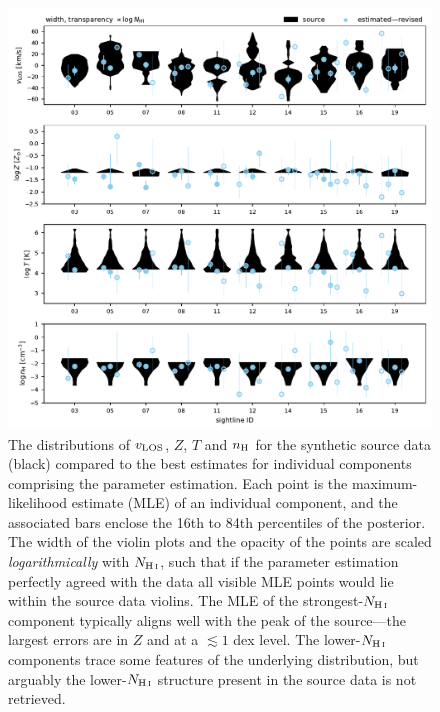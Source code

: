 \documentclass[fleqn,usenatbib]{mnras}
\begin{document}
\begin{figure}
    \centering
    \includegraphics[width=\textwidth]{figures/sample2/violin_vs_components_revised.pdf}
    \caption{
    The distributions of $v_{\rm LOS}$, $Z$, $T$ and $n_{\rm H}$ for the synthetic source data (black) compared to the best estimates for individual components comprising the parameter estimation.
    Each point is the maximum-likelihood estimate (MLE) of an individual component,
    and the associated bars enclose the 16th to 84th percentiles of the posterior.
    The width of the violin plots and the opacity of the points are scaled \textit{logarithmically} with $N_{\ion{H}{I}}$,
    such that if the parameter estimation perfectly agreed with the data all visible MLE points would lie within the source data violins.
    The MLE of the strongest-$N_{\ion{H}{I}}$ component typically aligns well with the peak of the source---the largest errors are in $Z$ and at a $\lesssim 1$ dex level.
    The lower-$N_{\ion{H}{I}}$ components trace some features of the underlying distribution,
    but arguably the lower-$N_{\ion{H}{I}}$ structure present in the source data is not retrieved.
    }
    \label{f: sample2 violin vs components}
\end{figure}
\end{document}
